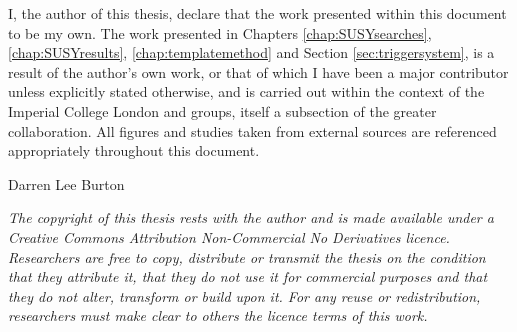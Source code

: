 \begin{declaration}
  I, the author of this thesis, declare that the work presented within this document to be my own.  The work presented in Chapters \ref{chap:SUSYsearches}, \ref{chap:SUSYresults},  \ref{chap:templatemethod} and Section \ref{sec:triggersystem}, is a result of the author's own work, or that of which I have been a major contributor unless explicitly stated otherwise, and is carried out within the context of the Imperial College London and \CERN \SUSY groups, itself a subsection of the greater \CMS collaboration.  All figures and studies taken from external sources are referenced appropriately throughout this document.
  
  \vspace*{1cm}
  \begin{flushright}
    Darren Lee Burton
  \end{flushright}

\small{\textit{The copyright of this thesis rests with the author and is made available under a Creative Commons Attribution Non-Commercial No Derivatives licence. Researchers are free to copy, distribute or transmit the thesis on the condition that they attribute it, that they do not use it for commercial purposes and that they do not alter, transform or build upon it. For any reuse or redistribution, researchers must make clear to others the licence terms of this work.}}

\end{declaration}



